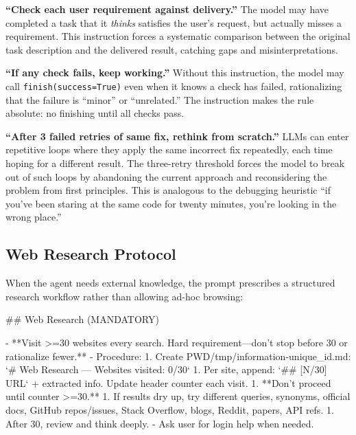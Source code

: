 \documentclass{article}
\begin{document}
\textbf{``Check each user requirement against delivery.''}  The model may have completed a task that it \emph{thinks} satisfies the user's request, but actually misses a requirement.  This instruction forces a systematic comparison between the original task description and the delivered result, catching gaps and misinterpretations.

\textbf{``If any check fails, keep working.''}  Without this instruction, the model may call \texttt{finish(success=True)} even when it knows a check has failed, rationalizing that the failure is ``minor'' or ``unrelated.''  The instruction makes the rule absolute: no finishing until all checks pass.

\textbf{``After 3 failed retries of same fix, rethink from scratch.''}  LLMs can enter repetitive loops where they apply the same incorrect fix repeatedly, each time hoping for a different result.  The three-retry threshold forces the model to break out of such loops by abandoning the current approach and reconsidering the problem from first principles.  This is analogous to the debugging heuristic ``if you've been staring at the same code for twenty minutes, you're looking in the wrong place.''

\subsection{Web Research Protocol}

When the agent needs external knowledge, the prompt prescribes a structured research workflow rather than allowing ad-hoc browsing:

\begin{prompt}
## Web Research (MANDATORY)

- **Visit >=30 websites every search. Hard requirement---don't stop before 30 or rationalize fewer.**
- Procedure:
  1. Create PWD/tmp/information-{unique_id}.md: `# Web Research --- Websites visited: 0/30`
  1. Per site, append: `## [N/30] URL` + extracted info. Update header counter each visit.
  1. **Don't proceed until counter >=30.**
  1. If results dry up, try different queries, synonyms, official docs, GitHub repos/issues, Stack Overflow, blogs, Reddit, papers, API refs.
  1. After 30, review and think deeply.
- Ask user for login help when needed.
\end{prompt}
\end{document}
